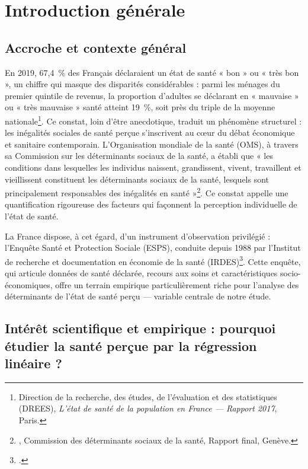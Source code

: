 \documentclass[11pt,a4paper]{memoirerecherche}
\begin{document}
\newpage

\hypertarget{chap-introduction}{%
\section{Introduction générale}\label{chap-introduction}}

\hypertarget{accroche-et-contexte-guxe9nuxe9ral}{%
\subsection{Accroche et contexte général}\label{accroche-et-contexte-guxe9nuxe9ral}}

En 2019, 67,4~\% des Français déclaraient un état de santé « bon » ou « très bon », un chiffre qui masque des disparités considérables : parmi les ménages du premier quintile de revenus, la proportion d'adultes se déclarant en « mauvaise » ou « très mauvaise » santé atteint 19~\%, soit près du triple de la moyenne nationale\footnote{Direction de la recherche, des études, de l'évaluation et des statistiques (DREES), \emph{L'état de santé de la population en France --- Rapport 2017}, Paris.}. Ce constat, loin d'être anecdotique, traduit un phénomène structurel : les inégalités sociales de santé perçue s'inscrivent au cœur du débat économique et sanitaire contemporain. L'Organisation mondiale de la santé (OMS), à travers sa Commission sur les déterminants sociaux de la santé, a établi que « les conditions dans lesquelles les individus naissent, grandissent, vivent, travaillent et vieillissent constituent les déterminants sociaux de la santé, lesquels sont principalement responsables des inégalités en santé »\footnote{\textcite{oms2008}, Commission des déterminants sociaux de la santé, Rapport final, Genève.}. Ce constat appelle une quantification rigoureuse des facteurs qui façonnent la perception individuelle de l'état de santé.

La France dispose, à cet égard, d'un instrument d'observation privilégié : l'Enquête Santé et Protection Sociale (ESPS), conduite depuis 1988 par l'Institut de recherche et documentation en économie de la santé (IRDES)\footnote{\textcite{irdes_esps}.}. Cette enquête, qui articule données de santé déclarée, recours aux soins et caractéristiques socio-économiques, offre un terrain empirique particulièrement riche pour l'analyse des déterminants de l'état de santé perçu --- variable centrale de notre étude.

\hypertarget{intuxe9ruxeat-scientifique-et-empirique-pourquoi-uxe9tudier-la-santuxe9-peruxe7ue-par-la-ruxe9gression-linuxe9aire}{%
\subsection{Intérêt scientifique et empirique : pourquoi étudier la santé perçue par la régression linéaire ?}\label{intuxe9ruxeat-scientifique-et-empirique-pourquoi-uxe9tudier-la-santuxe9-peruxe7ue-par-la-ruxe9gression-linuxe9aire}}
\end{document}
